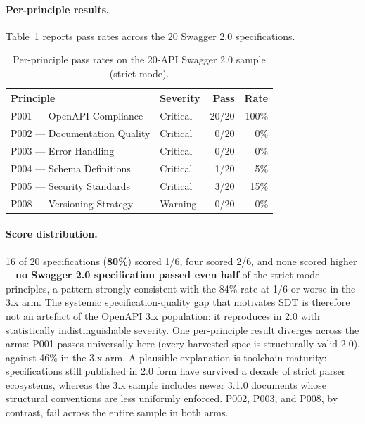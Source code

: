 \paragraph{Per-principle results.} Table~\ref{tab:swagger2-pass-rates} reports pass rates across the 20 Swagger 2.0 specifications.

\begin{table}[htbp]
\centering
\caption{Per-principle pass rates on the 20-API Swagger 2.0 sample (strict mode).}
\label{tab:swagger2-pass-rates}
\small
\begin{tabular}{@{}llrr@{}}
\toprule
\textbf{Principle} & \textbf{Severity} & \textbf{Pass} & \textbf{Rate} \\
\midrule
P001 — OpenAPI Compliance      & Critical & 20/20 & 100\% \\
P002 — Documentation Quality   & Critical & 0/20  & 0\%   \\
P003 — Error Handling          & Critical & 0/20  & 0\%   \\
P004 — Schema Definitions      & Critical & 1/20  & 5\%   \\
P005 — Security Standards      & Critical & 3/20  & 15\%  \\
P008 — Versioning Strategy     & Warning  & 0/20  & 0\%   \\
\bottomrule
\end{tabular}
\end{table}

\paragraph{Score distribution.} 16 of 20 specifications (\textbf{80\%}) scored 1/6, four scored 2/6, and none scored higher---\textbf{no Swagger 2.0 specification passed even half} of the strict-mode principles, a pattern strongly consistent with the 84\% rate at 1/6-or-worse in the 3.x arm. The systemic specification-quality gap that motivates SDT is therefore not an artefact of the OpenAPI 3.x population: it reproduces in 2.0 with statistically indistinguishable severity. One per-principle result diverges across the arms: P001 passes universally here (every harvested spec is structurally valid 2.0), against 46\% in the 3.x arm. A plausible explanation is toolchain maturity: specifications still published in 2.0 form have survived a decade of strict parser ecosystems, whereas the 3.x sample includes newer 3.1.0 documents whose structural conventions are less uniformly enforced. P002, P003, and P008, by contrast, fail across the entire sample in both arms.

